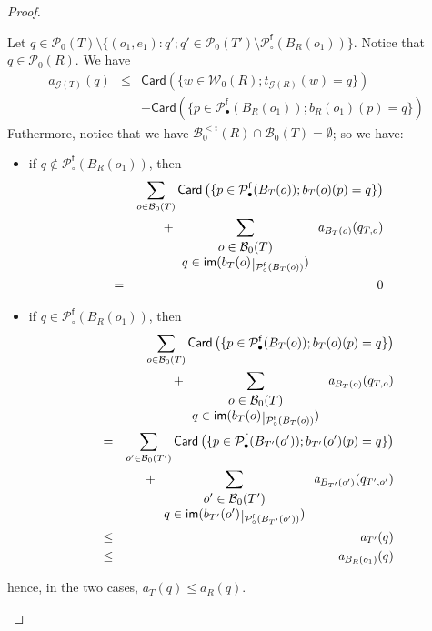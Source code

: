 \documentclass{article}
\newcommand{\target}[1]{t_{#1}}
\theoremstyle{plain}
\newcommand{\groundof}[1]{\mathcal{G}(#1)}
\def\restriction#1#2{\mathchoice
              {\setbox1\hbox{${\displaystyle #1}_{\scriptstyle #2}$}
              \restrictionaux{#1}{#2}}
              {\setbox1\hbox{${\textstyle #1}_{\scriptstyle #2}$}
              \restrictionaux{#1}{#2}}
              {\setbox1\hbox{${\scriptstyle #1}_{\scriptscriptstyle #2}$}
              \restrictionaux{#1}{#2}}
              {\setbox1\hbox{${\scriptscriptstyle #1}_{\scriptscriptstyle #2}$}
              \restrictionaux{#1}{#2}}}
\def\restrictionaux#1#2{{#1\,\smash{\vrule height .8\ht1 depth .85\dp1}}_{\,#2}}
\newcommand{\im}[1]{\textsf{im}(#1)}
\newcommand{\portsatzero}[1]{\mathcal{P}_0(#1)}
\newcommand{\wiresatzero}[1]{\mathcal{W}_0(#1)}
\newcommand{\arity}[1]{{\textit{a}}_{#1}}
\newcommand{\Card}[1]{\textsf{Card}\left( #1 \right)}
\newcommand{\conclusionscirc}[1]{\mathcal{P}_\circ^{\textsf{f}}(#1)}
\newcommand{\conclusionsnotcirc}[1]{\mathcal{P}_\bullet^{\textsf{f}}(#1)}
\newcommand{\boxesatzero}[1]{\mathcal{B}_{0}(#1)}
\newcommand{\boxesatzerosmaller}[2]{\mathcal{B}_0^{< #2}(#1)}
\begin{document}
\begin{proof}
\begin{itemize}
Let $q \in \portsatzero{T} \setminus \{ (o_1, e_1) : q' ; q' \in \portsatzero{T'} \setminus \conclusionscirc{B_R(o_1)} \}$. Notice that $q \in \portsatzero{R}$. We have 
\begin{eqnarray*}
\arity{\groundof{T}}(q) & \leq & \Card{\{ w \in \wiresatzero{R} ; \target{\groundof{R}}(w) = q \} } \\
& & + \Card{\{ p \in \conclusionsnotcirc{B_R(o_1)} ; b_R(o_1)(p) = q \}}
\end{eqnarray*}
Futhermore, notice that
we have $\boxesatzerosmaller{R}{i} \cap \boxesatzero{T} = \emptyset$; so we have:
\begin{itemize}
\item if $q \notin \conclusionscirc{B_R(o_1)}$, then 
\begin{eqnarray*}
& & \sum_{o \in \boxesatzero{T}} \Card{\{ p \in \conclusionsnotcirc{B_T(o)} ; b_T(o)(p) = q \}} \\
& & + \sum_{\begin{array}{c} o \in \boxesatzero{T}\\ q \in \im{\restriction{b_T(o)}{\conclusionscirc{B_T(o)}}}\end{array}} \arity{B_T(o)}(q_{T, o})\allowdisplaybreaks\\
& = & 0
\end{eqnarray*}
\item if $q \in \conclusionscirc{B_R(o_1)}$, then
\begin{eqnarray*}
& & \sum_{o \in \boxesatzero{T}} \Card{\{ p \in \conclusionsnotcirc{B_T(o)} ; b_T(o)(p) = q \}} \\
& & + \sum_{\begin{array}{c} o \in \boxesatzero{T}\\ q \in \im{\restriction{b_T(o)}{\conclusionscirc{B_T(o)}}}\end{array}} \arity{B_T(o)}(q_{T, o})\allowdisplaybreaks\\
& = & \sum_{o' \in \boxesatzero{T'}} \Card{\{ p \in \conclusionsnotcirc{B_{T'}(o')} ; b_{T'}(o')(p) = q \}}\\
& & + \sum_{\begin{array}{c} o' \in \boxesatzero{T'}\\
q \in \im{\restriction{b_{T'}(o')}{\conclusionscirc{B_{T'}(o')}}} \end{array}} \arity{B_{T'}(o')}(q_{T', o'})\allowdisplaybreaks\\
& \leq & \arity{T'}(q) \allowdisplaybreaks\\
& \leq & \arity{B_R(o_1)}(q)
\end{eqnarray*}
\end{itemize}
hence, in the two cases, $\arity{T}(q) \leq \arity{R}(q)$.


\end{itemize}
\end{proof}
\end{document}
